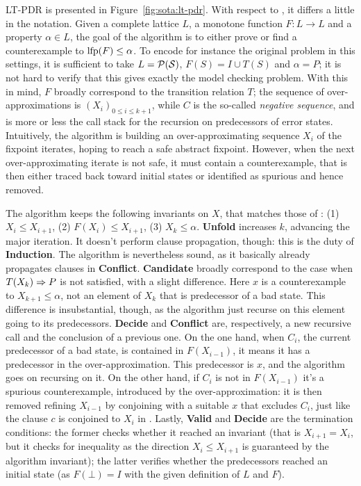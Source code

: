 LT-PDR is presented in Figure~\ref{fig:sota:lt-pdr}. With respect to , it differs a little in the notation. Given a complete lattice $L$, a monotone function $F: L \rightarrow L$ and a property $\alpha \in L$, the goal of the algorithm is to either prove or find a counterexample to $\text{lfp}(F) \le \alpha$. To encode for instance the original  problem in this settings, it is sufficient to take $L = \mathcal{P}(\mathcal{S})$, $F(S) = I \cup T(S)$ and $\alpha = P$; it is not hard to verify that this gives exactly the model checking problem.
With this in mind, $F$ broadly correspond to the transition relation $T$; the sequence of over-approximations is $( X_i )_{0 \le i \le k + 1}$, while $C$ is the so-called \emph{negative sequence}, and is more or less the call stack for the recursion on predecessors of error states.
Intuitively, the algorithm is building an over-approximating sequence $X_i$ of the fixpoint iterates, hoping to reach a safe abstract fixpoint. However, when the next over-approximating iterate is not safe, it must contain a counterexample, that is then either traced back toward initial states or identified as spurious and hence removed.

The algorithm keeps the following invariants on $X$, that matches those of : (1) $X_i \le X_{i+1}$, (2) $F(X_i) \le X_{i+1}$, (3) $X_k \le \alpha$.
\textbf{Unfold} increases $k$, advancing the major iteration. It doesn't perform clause propagation, though: this is the duty of \textbf{Induction}. The algorithm is nevertheless sound, as it basically already propagates clauses in \textbf{Conflict}. 
\textbf{Candidate} broadly correspond to the case when $T(X_k) \Rightarrow P$ is not satisfied, with a slight difference. Here $x$ is a counterexample to $X_{k+1} \le \alpha$, not an element of $X_k$ that is predecessor of a bad state. This difference is insubstantial, though, as the algorithm just recurse on this element going to its predecessors.
\textbf{Decide} and \textbf{Conflict} are, respectively, a new recursive call and the conclusion of a previous one. On the one hand, when $C_i$, the current predecessor of a bad state, is contained in $F (X_{i-1})$, it means it has a predecessor in the over-approximation. This predecessor is $x$, and the algorithm goes on recursing on it. On the other hand, if $C_i$ is not in $F (X_{i-1})$ it's a spurious counterexample, introduced by the over-approximation: it is then removed refining $X_{i-1}$ by conjoining with a suitable $x$ that excludes $C_i$, just like the clause $c$ is conjoined to $X_i$ in .
Lastly, \textbf{Valid} and \textbf{Decide} are the termination conditions: the former checks whether it reached an invariant (that is $X_{i+1} = X_i$, but it checks for inequality as the direction $X_i \le X_{i+1}$ is guaranteed by the algorithm invariant); the latter verifies whether the predecessors reached an initial state (as $F(\bot) = I$ with the given definition of $L$ and $F$).

